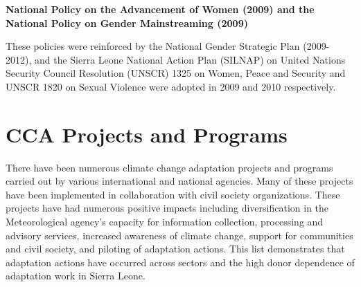\documentclass[
]{book}
\begin{document}
\textbf{National Policy on the Advancement of Women (2009) and the National Policy on Gender Mainstreaming (2009)}

These policies were reinforced by the National Gender Strategic Plan (2009-2012), and the Sierra Leone National Action Plan (SILNAP) on United Nations Security Council Resolution (UNSCR) 1325 on Women, Peace and Security and UNSCR 1820 on Sexual Violence were adopted in 2009 and 2010 respectively.

\hypertarget{cca-projects-and-programs}{%
\section{CCA Projects and Programs}\label{cca-projects-and-programs}}

There have been numerous climate change adaptation projects and programs carried out by various international and national agencies. Many of these projects have been implemented in collaboration with civil society organizations. These projects have had numerous positive impacts including diversification in the Meteorological agency's capacity for information collection, processing and advisory services, increased awareness of climate change, support for communities and civil society, and piloting of adaptation actions. This list demonstrates that adaptation actions have occurred across sectors and the high donor dependence of adaptation work in Sierra Leone.

\providecommand{\docline}[3]{\noalign{\global\setlength{\arrayrulewidth}{#1}}\arrayrulecolor[HTML]{#2}\cline{#3}}

\setlength{\tabcolsep}{2pt}

\renewcommand*{\arraystretch}{1.5}
\end{document}
